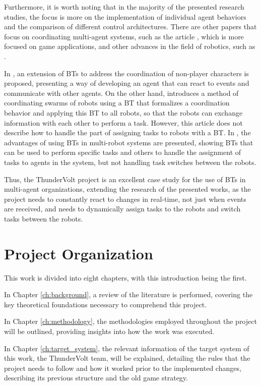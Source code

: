 Furthermore, it is worth noting that in the majority of the presented research studies, the focus is more on the implementation of individual agent behaviors and the comparison of different control architectures. There are other papers that focus on coordinating multi-agent systems, such as the article \cite{Event-DrivenBTs}, which is more focused on game applications, and other advances in the field of robotics, such as \cite{Self-ReactivePlanningOfMulti-Robots, BTsMultRobot}.

In \cite{Event-DrivenBTs}, an extension of BTs to address the coordination of non-player characters is proposed, presenting a way of developing an agent that can react to events and communicate with other agents. On the other hand, \cite{Self-ReactivePlanningOfMulti-Robots} introduces a method of coordinating swarms of robots using a BT that formalizes a coordination behavior and applying this BT to all robots, so that the robots can exchange information with each other to perform a task. However, this article does not describe how to handle the part of assigning tasks to robots with a BT. In \cite{BTsMultRobot}, the advantages of using BTs in multi-robot systems are presented, showing BTs that can be used to perform specific tasks and others to handle the assignment of tasks to agents in the system, but not handling task switches between the robots.

Thus, the ThunderVolt project is an excellent case study for the use of BTs in multi-agent organizations, extending the research of the presented works, as the project needs to constantly react to changes in real-time, not just when events are received, and needs to dynamically assign tasks to the robots and switch tasks between the robots.

\section{Project Organization}

This work is divided into eight chapters, with this introduction being the first.

In Chapter \ref{ch:background}, a review of the literature is performed, covering the key theoretical foundations necessary to comprehend this project.

In Chapter \ref{ch:methodology}, the methodologies employed throughout the project will be outlined, providing insights into how the work was executed.

In Chapter \ref{ch:target_system}, the relevant information of the target system of this work, the ThunderVolt team, will be explained, detailing the rules that the project needs to follow and how it worked prior to the implemented changes, describing its previous structure and the old game strategy.

